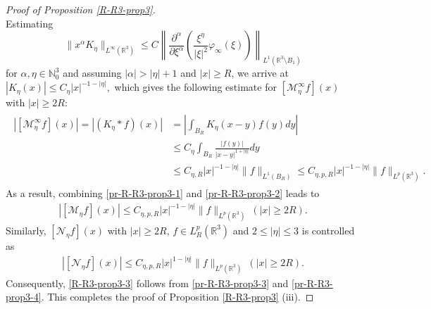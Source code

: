 \documentclass[dvipdfmx,12pt]{article}
\begin{document}
\begin{proof}[Proof of Proposition \ref{R-R3-prop3}]
\[\]
Estimating
\[
\|x^\alpha K_\eta\|_{L^\infty(\mathbb{R}^3)}\le C\left\|\frac{\partial^\alpha}{\partial \xi^\alpha} \left(\frac{\xi^\eta}{|\xi|^2}\varphi_\infty(\xi) \right) \right\|_{L^1(\mathbb{R}^3\setminus B_1)}
\]
for $\alpha,\eta\in \mathbb{N}_0^3$ and assuming $|\alpha|>|\eta|+1$ and $|x|\ge R$, we arrive at
$
|K_\eta(x)|\le C_\eta |x|^{-1-|\eta|}, 
$ 
which gives the following estimate for $[\mathcal{M}_\eta^\infty f](x)$ with $|x|\ge 2R$:
\begin{gather}\label{pr-R-R3-prop3-2}
\begin{aligned}
|[\mathcal{M}_\eta^\infty f](x)|
= |(K_\eta * f)(x)| 
&= \left|\int_{B_R} K_\eta(x-y) f(y) dy \right| \\
&\le C_\eta \int_{B_R} \frac{|f(y)|}{|x-y|^{1+|\eta|}} dy \\
&\le C_{\eta,R}|x|^{-1-|\eta|}\|f\|_{L^1(B_R)}\le C_{\eta,p,R}|x|^{-1-|\eta|}\|f\|_{L^p(\mathbb{R}^3)}.
\end{aligned}
\end{gather}
As a result, combining \eqref{pr-R-R3-prop3-1} and \eqref{pr-R-R3-prop3-2} leads to
\begin{gather}\label{pr-R-R3-prop3-3}
|[\mathcal{M}_\eta f](x)|\le C_{\eta,p,R}|x|^{-1-|\eta|}\|f\|_{L^p(\mathbb{R}^3)}~(|x|\ge 2R).
\end{gather}
Similarly, $[\mathcal{N}_{\eta} f](x)$ with $|x|\ge 2R$, $f\in L_R^p(\mathbb{R}^3)$ and $2\le |\eta|\le 3$ is controlled as  
\begin{gather}\label{pr-R-R3-prop3-4}
|[\mathcal{N}_{\eta} f](x)|\le C_{\eta,p,R}|x|^{1-|\eta|}\|f\|_{L^p(\mathbb{R}^3)}~(|x|\ge 2R).
\end{gather}
Consequently, \eqref{R-R3-prop3-3} follows from \eqref{pr-R-R3-prop3-3} and \eqref{pr-R-R3-prop3-4}. This completes the proof of Proposition \ref{R-R3-prop3} (iii).
\end{proof}
\end{document}
